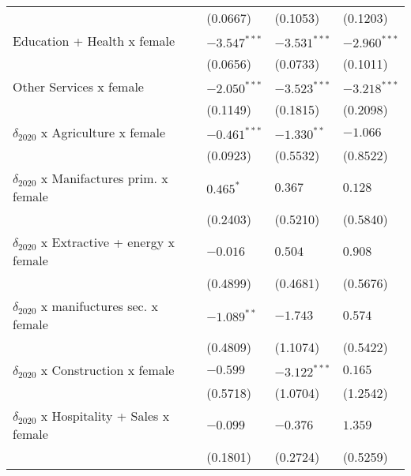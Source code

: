 \begin{tabular}{llll}
                                                   &           (0.0667) &           (0.1053) &           (0.1203) \\
Education + Health x female                        &     $-3.547^{***}$ &     $-3.531^{***}$ &     $-2.960^{***}$ \\
                                                   &           (0.0656) &           (0.0733) &           (0.1011) \\
Other Services x female                            &     $-2.050^{***}$ &     $-3.523^{***}$ &     $-3.218^{***}$ \\
                                                   &           (0.1149) &           (0.1815) &           (0.2098) \\
$\delta_{2020}$ x Agriculture x female             &     $-0.461^{***}$ &      $-1.330^{**}$ &           $-1.066$ \\
                                                   &           (0.0923) &           (0.5532) &           (0.8522) \\
$\delta_{2020}$ x Manifactures prim. x female      &          $0.465^*$ &            $0.367$ &            $0.128$ \\
                                                   &           (0.2403) &           (0.5210) &           (0.5840) \\
$\delta_{2020}$ x Extractive + energy x female     &           $-0.016$ &            $0.504$ &            $0.908$ \\
                                                   &           (0.4899) &           (0.4681) &           (0.5676) \\
$\delta_{2020}$ x manifuctures sec. x female       &      $-1.089^{**}$ &           $-1.743$ &            $0.574$ \\
                                                   &           (0.4809) &           (1.1074) &           (0.5422) \\
$\delta_{2020}$ x Construction x female            &           $-0.599$ &     $-3.122^{***}$ &            $0.165$ \\
                                                   &           (0.5718) &           (1.0704) &           (1.2542) \\
$\delta_{2020}$ x Hospitality + Sales x female     &           $-0.099$ &           $-0.376$ &            $1.359$ \\
                                                   &           (0.1801) &           (0.2724) &           (0.5259) \\

\end{tabular}
